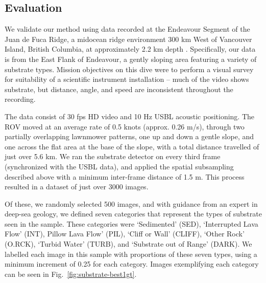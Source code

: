 \subsection{Evaluation}

We validate our method using data recorded at the Endeavour Segment of the Juan de Fuca Ridge, a midocean
ridge environment 300 km West of Vancouver Island, British Columbia, at approximately 2.2 km depth \citep{endeavourMPAPlan}. Specifically, our data is from the East Flank of Endeavour, a gently sloping area featuring a variety of substrate types. Mission objectives on this dive were to perform a visual survey for suitability of a scientific instrument installation -- much of the video shows substrate, but distance, angle, and speed are inconsistent throughout the recording.

The data consist of 30 fps HD video and 10 Hz USBL acoustic positioning. The ROV moved at an average rate of 0.5 knots (approx. 0.26 m/s), through two partially overlapping lawnmower patterns, one up and down a gentle slope, and one across the flat area at the base of the slope, with a total distance travelled of just over 5.6 km. We ran the substrate detector on every third frame (synchronized with the USBL data), and applied the spatial subsampling described above with a minimum inter-frame distance of 1.5 m. This process resulted in a dataset of just over 3000 images.

Of these, we randomly selected 500 images, and with guidance from an expert in deep-sea geology, we defined seven categories that represent the types of substrate seen in the sample. These categories were ‘Sedimented’ (SED), ‘Interrupted Lava Flow’ (INT), Pillow Lava Flow’ (PIL), ‘Cliff or Wall’ (CLIFF), ‘Other Rock’ (O.RCK), ‘Turbid Water’ (TURB), and ‘Substrate out of Range’ (DARK). We labelled each image in this sample with proportions of these seven types, using a minimum increment of 0.25 for each category. Images exemplifying each category can be seen in Fig.~\ref{fig:substrate-best1gt}.


